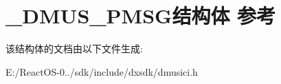 \hypertarget{struct___d_m_u_s___p_m_s_g}{}\section{\+\_\+\+D\+M\+U\+S\+\_\+\+P\+M\+S\+G结构体 参考}
\label{struct___d_m_u_s___p_m_s_g}


该结构体的文档由以下文件生成\+:\begin{DoxyCompactItemize}
\item 
E\+:/\+React\+O\+S-\/0../sdk/include/dxsdk/dmusici.\+h\end{DoxyCompactItemize}
